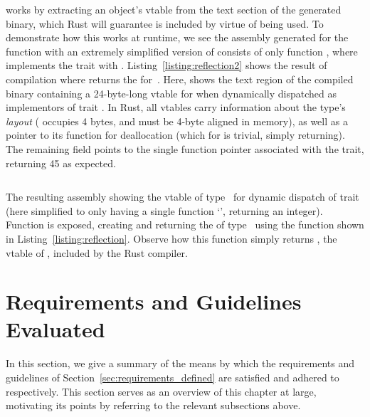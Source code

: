  works by extracting an object's vtable from the text section of the generated binary, which Rust will guarantee is included by virtue of being used. To demonstrate how this works at runtime, we see the assembly generated for the  function with an extremely simplified version of  consists of only function , where  implements the trait with . Listing~\ref{listing:reflection2} shows the result of compilation where  returns the  for~. Here,  shows the text region of the compiled binary containing a 24-byte-long vtable for  when dynamically dispatched as implementors of trait . In Rust, all vtables carry information about the type's \textit{layout} ( occupies 4 bytes, and must be 4-byte aligned in memory), as well as a pointer to its  function for deallocation (which for  is trivial, simply returning). The remaining field points to the single function pointer associated with the trait, returning 45 as expected.  

\begin{listing}[ht]
	\centering
	\inputminted{text}{reflection2.rs}
	\caption[Example of assembly generated for extracting a vtable.]{The resulting assembly showing the vtable of type~ for dynamic dispatch of trait  (here simplified to only having a single function `', returning an integer). Function  is exposed, creating and returning the  of type~ using the function shown in Listing~\ref{listing:reflection}. Observe how this function simply returns , the vtable of , included by the Rust compiler.}
	\label{listing:reflection2}
\end{listing}


\section{Requirements and Guidelines Evaluated}
\label{sec:requirements_evaluated}
In this section, we give a summary of the means by which the requirements and guidelines of Section~\ref{sec:requirements_defined} are satisfied and adhered to respectively. This section serves as an overview of this chapter at large, motivating its points by referring to the relevant subsections above.


